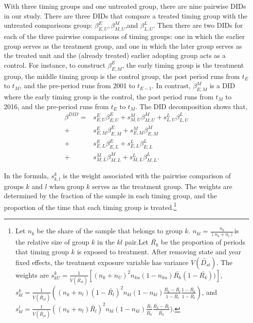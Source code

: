 \documentclass[12pt]{article}%
\begin{document}
With three timing groups and one untreated group, there are nine pairwise DIDs in our study. There are three DIDs that compare a treated timing group with the untreated comparisons group: $\beta_{E,U}^E,\beta_{M,U}^M$,and $\beta_{L,U}^L$. Then there are two DIDs for each of the three pairwise comparisons of timing groups: one in which the earlier group serves as the treatment group, and one in which the later group serves as the treated unit and the (already treated) earlier adopting group acts as a control. For instance, to construct $\beta_{E,M}^E$, the early timing group is the treatment group, the middle timing group is the control group, the post period runs from $t_E$ to $t_M$, and the pre-period runs from 2001 to $t_{E-1}$. In contrast, $\beta_{E,M}^M $ is a DID where the early timing group is the control, the post period runs from $t_M$ to 2016, and the pre-period runs from $t_E$  to $t_M$. The DID decomposition shows that,
%
\vspace{-.25cm}
\begin{align*}
\beta^{DID}= &s_{E,U}^E \beta_{E,U}^E + s_{M,U}^M \beta_{M,U}^M + s_{L,U}^L \beta_{L,U}^L \\
+&s_{E,M}^E \beta_{E,M}^E + s_{E,M}^M\beta_{E,M}^M  \\
+&s_{E,L}^E \beta_{E,L}^E + s_{E,L}^L\beta_{E,L}^L  \\
+&s_{M,L}^M \beta_{M,L}^M + s_{M,L}^L\beta_{M,L}^L. 
\end{align*}


In the formula, $s_{k,l}^k$ is the weight associated with the pairwise comparison of groups $k$ and $l$ when group $k$ serves as the treatment group. The weights are determined by the fraction of the sample in each timing group, and the proportion of the time that each timing group is treated.\footnote{Let $n_k$ be the share of the sample that belongs to group $k$. $n_{kl} = \frac{n_k}{(n_k +n_l)} $is the relative size of group $k$ in the $kl$ pair.Let $\bar{R_k}$ be the proportion of periods that timing group $k$ is exposed to treatment. After removing state and year fixed effects, the treatment exposure variable has variance $V(\tilde{D_{st}}) $. The weights  are $s_{kU}^k=\frac{1}{V(\tilde{R_{st}})}[(n_k + n_U)^2 n_{ku}(1-n_{ku})\bar{R_k}(1-\bar{R_k}))] $, $s_{kl}^k=\frac{1}{V(\tilde{R_{st}})}((n_k + n_l) (1-\bar{R_l})^2n_{kl}(1-n_{kl})\frac{\bar{R_k}-\bar{R_l}}{1-\bar{R_l}} \frac{1-\bar{R_k}}{1-\bar{R_l}})$, and $s_{kl}^l=\frac{1}{V(\tilde{R_{st}})}((n_k + n_l)\bar{R_l})^2 n_{kl}(1 - n_{kl})\frac{\bar{R_l}}{\bar{R_k}} \frac{\bar{R_k}- \bar{R_l}}{\bar{R_k}})$.}
\end{document}
